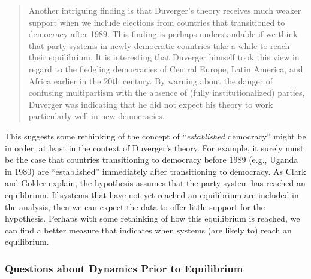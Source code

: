 \documentclass[12pt]{article}
\begin{document}
\begin{quote}
Another intriguing finding is that Duverger's theory receives much weaker support when we include elections from countries that transitioned to democracy after 1989. 
This finding is perhaps understandable if we think that party systems in newly democratic countries take a while to reach their equilibrium. 
It is interesting that Duverger himself took this view in regard to the fledgling democracies of Central Europe, Latin America, and Africa earlier in the 20th century. 
By warning about the danger of confusing multipartism with the absence of (fully institutionalized) parties, Duverger was indicating that he did not expect his theory to work particularly well in new democracies. 
\end{quote}

This suggests some rethinking of the concept of ``\textit{established} democracy'' might be in order, at least in the context of Duverger's theory. 
For example, it surely must be the case that countries transitioning to democracy before 1989 (e.g., Uganda in 1980) are ``established'' immediately after transitioning to democracy. 
As Clark and Golder explain, the hypothesis assumes that the party system has reached an equilibrium. If systems that have not yet reached an equilibrium are included in the analysis, then we can expect the data to offer little support for the hypothesis. 
Perhaps with some rethinking of how this equilibrium is reached, we can find a better measure that indicates when systems (are likely to) reach an equilibrium.


\subsubsection*{Questions about Dynamics Prior to Equilibrium}
\end{document}
